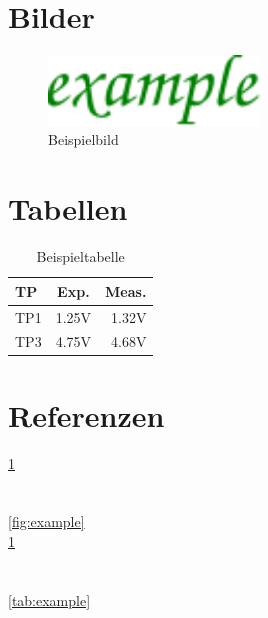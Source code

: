 \documentclass[a4paper, 10pt, fleqn]{article}
\begin{document}
\newpage

\section{Bilder}
\begin{figure}[h!]
    \centering
    \includegraphics[width=0.5\textwidth] {../fig/example.pdf}
    \caption{Beispielbild}
    \label{fig:example}
\end{figure}

\newpage

\section{Tabellen}
\begin{table}[h!]
    \centering
    \begin{tabular}{l|c|r}
        TP  & Exp.  & Meas. \\
        \hline
        TP1 & 1.25V & 1.32V \\
        TP3 & 4.75V & 4.68V \\
    \end{tabular}
    \caption{Beispieltabelle}
    \label{tab:example}
\end{table}

\newpage

\section{Referenzen}

\ref{fig:example} \\
\pageref{fig:example} \\
 \\
\autoref{fig:example} \\
\ref{tab:example} \\
\pageref{tab:example} \\
 \\
\autoref{tab:example} \\

\newpage

\tableofcontents
\listoffigures
\listoftables
\end{document}

